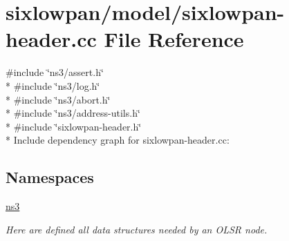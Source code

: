 \hypertarget{sixlowpan-header_8cc}{}\section{sixlowpan/model/sixlowpan-\/header.cc File Reference}
\label{sixlowpan-header_8cc}
{\ttfamily \#include \char`\"{}ns3/assert.\+h\char`\"{}}\\*
{\ttfamily \#include \char`\"{}ns3/log.\+h\char`\"{}}\\*
{\ttfamily \#include \char`\"{}ns3/abort.\+h\char`\"{}}\\*
{\ttfamily \#include \char`\"{}ns3/address-\/utils.\+h\char`\"{}}\\*
{\ttfamily \#include \char`\"{}sixlowpan-\/header.\+h\char`\"{}}\\*
Include dependency graph for sixlowpan-\/header.cc\+:
\subsection*{Namespaces}
\begin{DoxyCompactItemize}
\item 
 \hyperlink{namespacens3}{ns3}
\begin{DoxyCompactList}\small\item\em Here are defined all data structures needed by an O\+L\+SR node. \end{DoxyCompactList}\end{DoxyCompactItemize}
